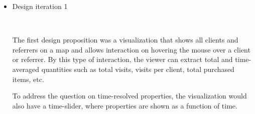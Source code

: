 \documentclass[12pt]{article}
\begin{document}
\begin{itemize}

\item Design iteration 1

\begin{center}
 \\
\end{center}

The first design proposition was a visualization that shows all clients and referrers on a map and allows
interaction on hovering the mouse over a client or referrer. By this type of interaction, the viewer can
extract total and time-averaged quantities such as total visits, visits per client, total purchased items, etc.

To address the question on time-resolved properties, the visualization would also have a time-slider, where
properties are shown as a function of time.


\end{itemize}
\end{document}
